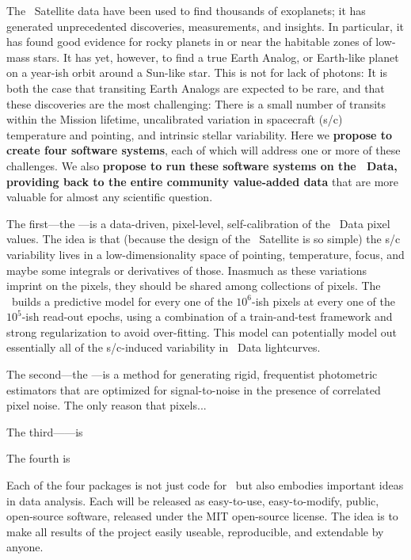 \documentclass[letterpaper,12pt]{article}
\newcommand{\PLM}{\package{PLM}}
\newcommand{\OWL}{\package{OWL}}
\newcommand{\George}{\package{George}}
\newcommand{\kpsf}{\package{kpsf}}
\begin{document}
The \Kepler\ Satellite data have been used to find thousands of exoplanets;
it has generated unprecedented discoveries, measurements, and insights.
In particular, it has found good evidence for rocky planets in or near the
habitable zones of low-mass stars.
It has yet, however, to find a true Earth Analog, or Earth-like planet on a
year-ish orbit around a Sun-like star.
This is not for lack of photons:
It is both the case that transiting Earth Analogs are expected to be rare, and
that these discoveries are the most challenging:
There is a small number of transits within the Mission lifetime,
uncalibrated variation in spacecraft (s/c) temperature and pointing,
and intrinsic stellar variability.
Here we \textbf{propose to create four software systems}, each of which will
address one or more of these challenges.
We also \textbf{propose to run these software systems on the \Kepler\ Data,
providing back to the entire community value-added data} that are more valuable
for almost any scientific question.

The first---the \PLM---is a data-driven, pixel-level, self-calibration of the
\Kepler\ Data pixel values.  
The idea is that (because the design of the \Kepler\ Satellite is so simple)
the s/c variability lives in a low-dimensionality space of pointing,
temperature, focus, and maybe some integrals or derivatives of those.
Inasmuch as these variations imprint on the pixels, they should be shared among
collections of pixels.
The \PLM\ builds a predictive model for every one of the $10^6$-ish pixels at
every one of the $10^5$-ish read-out epochs, using a combination of a
train-and-test framework and strong regularization to avoid over-fitting.
This model can potentially model out essentially all of the s/c-induced
variability in \Kepler\ Data lightcurves.

The second---the \OWL---is a method for generating rigid, frequentist
photometric estimators that are optimized for signal-to-noise in the presence
of correlated pixel noise.
The only reason that pixels...

The third---\George---is 

The fourth is \kpsf

Each of the four packages is not just code for \Kepler\ but also embodies
important ideas in data analysis.
Each will be released as easy-to-use, easy-to-modify, public, open-source
software, released under the MIT open-source license.
The idea is to make all results of the project easily useable, reproducible, and
extendable by anyone.
\end{document}
